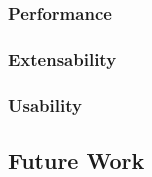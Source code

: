 
\subsubsection{Performance}
\subsubsection{Extensability}
\subsubsection{Usability}

\subsection{Future Work}